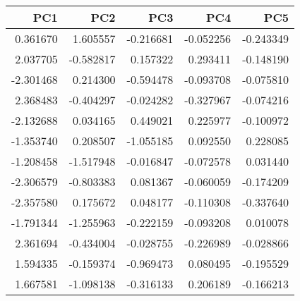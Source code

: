 \begin{tabular}{rrrrr}
\toprule
      PC1 &       PC2 &       PC3 &       PC4 &       PC5 \\
\midrule
 0.361670 &  1.605557 & -0.216681 & -0.052256 & -0.243349 \\
 2.037705 & -0.582817 &  0.157322 &  0.293411 & -0.148190 \\
-2.301468 &  0.214300 & -0.594478 & -0.093708 & -0.075810 \\
 2.368483 & -0.404297 & -0.024282 & -0.327967 & -0.074216 \\
-2.132688 &  0.034165 &  0.449021 &  0.225977 & -0.100972 \\
-1.353740 &  0.208507 & -1.055185 &  0.092550 &  0.228085 \\
-1.208458 & -1.517948 & -0.016847 & -0.072578 &  0.031440 \\
-2.306579 & -0.803383 &  0.081367 & -0.060059 & -0.174209 \\
-2.357580 &  0.175672 &  0.048177 & -0.110308 & -0.337640 \\
-1.791344 & -1.255963 & -0.222159 & -0.093208 &  0.010078 \\
 2.361694 & -0.434004 & -0.028755 & -0.226989 & -0.028866 \\
 1.594335 & -0.159374 & -0.969473 &  0.080495 & -0.195529 \\
 1.667581 & -1.098138 & -0.316133 &  0.206189 & -0.166213 \\
\bottomrule
\end{tabular}
